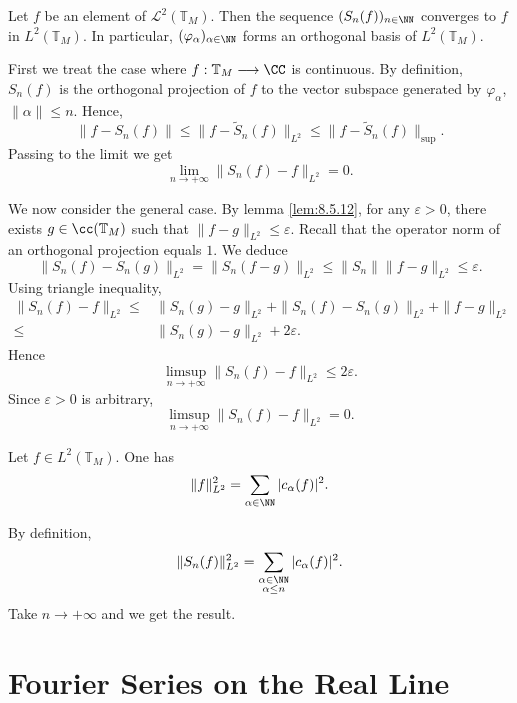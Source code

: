 \begin{theoremenv}
    Let $f$ be an element of $\mathcal{L}^2(\mathbb{T}_{M})$.
    Then the sequence $(S_n(f))_{n \in \NN}$ converges to $f$ in $L^2(\mathbb{T}_{M})$.
    In particular, $(\varphi_{\alpha})_{\alpha \in \NN}$ forms an orthogonal basis of $L^2(\mathbb{T}_{M})$.
\end{theoremenv}
\begin{proofenv}
    First we treat the case where $f : \mathbb{T}_{M} \longrightarrow \CC$ is continuous.
    By definition, $S_{n}(f)$ is the orthogonal projection of $f$ to the vector subspace generated by $\varphi_{\alpha}$, $\|\alpha\| \le n$.
    Hence,
    $$\|f - S_{n}(f)\| \le \|f - \tilde{S}_{n}(f)\|_{L^2} \le \|f - \tilde{S}_{n}(f)\|_{\mathrm{sup}}.$$
    Passing to the limit we get
    $$\lim_{n \rightarrow +\infty} \|S_{n}(f) - f\|_{L^2} = 0.$$
    
    \quad We now consider the general case.
    By lemma \ref{lem:8.5.12}, for any $\varepsilon > 0$, there exists $g \in \cc(\mathbb{T}_{M})$ such that $\|f - g\|_{L^2} \le \varepsilon$.
    Recall that the operator norm of an orthogonal projection equals $1$.
    We deduce
    $$\|S_{n}(f) - S_{n}(g)\|_{L^2} = \|S_{n}(f - g)\|_{L^2} \le \|S_{n}\| \|f - g\|_{L^2} \le \varepsilon.$$
    Using triangle inequality,
    $$\begin{aligned}
        \|S_{n}(f) - f\|_{L^2} \le & \|S_{n}(g) - g\|_{L^2} + \|S_n(f) - S_{n}(g)\|_{L^2} + \| f - g\|_{L^2}\\
        \le & \|S_n(g) - g\|_{L^2} + 2 \varepsilon.
    \end{aligned}$$
    Hence
    $$\limsup_{n \to +\infty} \|S_{n}(f) - f\|_{L^2} \le 2 \varepsilon.$$
    Since $\varepsilon > 0$ is arbitrary,
    $$\limsup_{n \to +\infty} \|S_{n}(f) - f\|_{L^2} = 0.$$
\end{proofenv}

\begin{corollaryenv}
    Let $f \in L^2(\mathbb{T}_{M})$.
    One has
    $$\|f\|^2_{L^2} = \sum_{\alpha \in \NN} |c_{\alpha} (f)|^2.$$
\end{corollaryenv}
\begin{proofenv}
    By definition,
    $$\|S_{n}(f)\|_{L^2}^2 = \sum_{\substack{\alpha \in \NN\\ \alpha \le n}} |c_{\alpha} (f)|^2.$$
    Take $n \to +\infty$ and we get the result.
\end{proofenv}


\section{Fourier Series on the Real Line}


